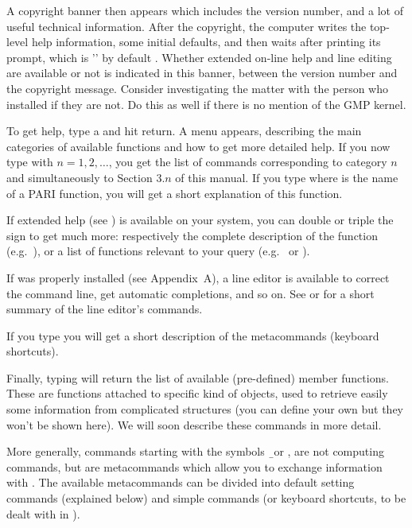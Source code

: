 A copyright banner then appears which includes the version number, and a lot
of useful technical information. After the copyright, the computer writes the
top-level help information, some initial defaults, and then waits after
printing its prompt, which is '' by default . Whether extended
on-line help and line editing are available or not is indicated in this
 banner, between the version number and the copyright message.
Consider investigating the matter with the person who installed  if
they are not. Do this as well if there is no mention of the GMP kernel.


To get help, type a  and hit return. A menu appears, describing the
main categories of available functions and how to get more detailed
help. If you now type  with $n = 1, 2, \dots$, you get the list of
commands corresponding to category $n$ and simultaneously to Section $3.n$ of
this manual. If you type  where 
is the name of a PARI function, you will get a short explanation of this
function.

If extended help (see ) is available on your system,
you can double or triple the  sign to get much more: respectively the
complete description of the function (e.g.~), or a list of
 functions relevant to your query (e.g.~ 
or ).

If  was properly installed (see Appendix~A), a line editor is
available to correct the command line, get automatic completions, and so on.
See  or  for a short summary of the line
editor's commands.

If you type  you will get a short description of the metacommands
(keyboard shortcuts).

Finally, typing  will return the list of available (pre-defined)
member functions. These are functions attached to specific kind of objects,
used to retrieve easily some information from complicated structures (you can
define your own but they won't be shown here). We will soon describe these
commands in more detail.

More generally, commands starting with the symbols \b\ or , are not
computing commands, but are metacommands which allow you to exchange
information with . The available metacommands can be divided into
default setting commands (explained below) and simple commands (or keyboard
shortcuts, to be dealt with in ).

